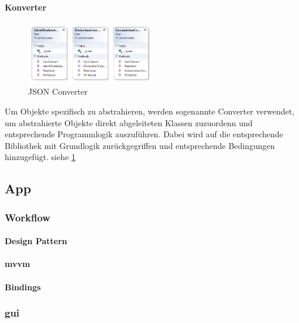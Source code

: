 \newpage
\paragraph{Konverter}
\begin{figure}
	\begin{center}
		\includegraphics[width=0.5\textwidth]{images/uml/json_converter.png}
	\end{center}
	\caption{JSON Converter}
	\label{fig:converter_classdiagram}
\end{figure}

Um Objekte spezifisch zu abstrahieren, werden sogenannte Converter verwendet, um abstrahierte Objekte direkt abgeleiteten Klassen zuzuordenn und entsprechende Programmlogik auszuführen. Dabei wird auf die entsprechende Bibliothek mit Grundlogik zurückgegriffen und entsprechende Bedingungen hinzugefügt. siehe \ref{fig:converter_classdiagram}



\newpage
\subsection{App}

\subsubsection{Workflow} %

\paragraph{Design Pattern}
\paragraph{\acrfull{mvvm}}
\paragraph{Bindings}

\subsubsection{\acrfull{gui}} %

